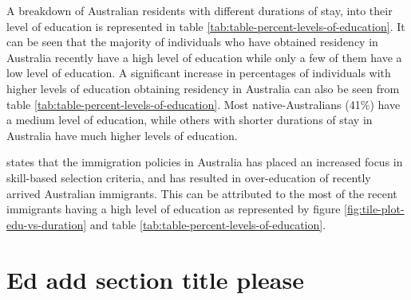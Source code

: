 \documentclass[11pt,a4paper,]{article}
\begin{document}
\begin{table}[H]

\caption{\label{tab:table-percent-levels-of-education}Percentages of Australian residents with different levels of education over each category of duration of stay}
\centering
{}
\end{table}

A breakdown of Australian residents with different durations of stay, into their level of education is represented in table \ref{tab:table-percent-levels-of-education}. It can be seen that the majority of individuals who have obtained residency in Australia recently have a high level of education while only a few of them have a low level of education. A significant increase in percentages of individuals with higher levels of education obtaining residency in Australia can also be seen from table \ref{tab:table-percent-levels-of-education}. Most native-Australians (41\%) have a medium level of education, while others with shorter durations of stay in Australia have much higher levels of education.

\textcite{green2007immigrant} states that the immigration policies in Australia has placed an increased focus in skill-based selection criteria, and has resulted in over-education of recently arrived Australian immigrants. This can be attributed to the most of the recent immigrants having a high level of education as represented by figure \ref{fig:tile-plot-edu-vs-duration} and table \ref{tab:table-percent-levels-of-education}.

\section* {Ed add section title please}
\end{document}
